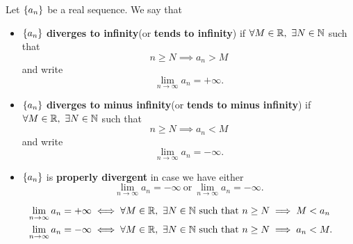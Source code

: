 \documentclass[11pt,openany]{article}
\begin{document}
\begin{tcolorbox}[colback=white]
	\begin{definition}[\bf Divergence]
		Let $\set{a_n}$ be a real sequence. We say that \begin{itemize}
			\item $\set{a_n}$ \textbf{diverges to infinity}(or \textbf{tends to infinity}) if $\forall M\in\mathbb{R},\ \exists N\in\mathbb{N}$ such that \[
			n\geq N\implies a_n>M
			\] and write \[
			\lim_{n\to\infty}a_n=+\infty.
			\]
			\item $\set{a_n}$ \textbf{diverges to minus infinity}(or \textbf{tends to minus infinity}) if $\forall M\in\mathbb{R},\ \exists N\in\mathbb{N}$ such that \[
			n\geq N\implies a_n<M
			\] and write \[
			\lim_{n\to\infty}a_n=-\infty.
			\]
			\item $\set{a_n}$ is \textbf{properly divergent} in case we have either \[
			\lim_{n\to\infty}a_n=-\infty\ \text{or}\ \lim_{n\to\infty}a_n=-\infty.
			\]
		\end{itemize}
	\end{definition}    
\end{tcolorbox}
\begin{remark}
	\begin{align*}
		\lim_{n\to\infty}a_n=+\infty&\iff \forall M\in\mathbb{R},\ \exists N\in\mathbb{N}\ \text{such that}\ n\geq N\implies M<a_n\\
		\lim_{n\to\infty}a_n=-\infty&\iff \forall M\in\mathbb{R},\ \exists N\in\mathbb{N}\ \text{such that}\ n\geq N\implies a_n<M.
	\end{align*}
\end{remark}
\end{document}
